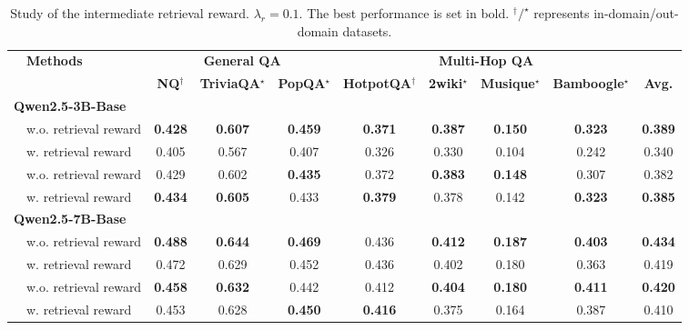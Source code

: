 \begin{table}[t]
    \centering
    \scriptsize
    \setlength{\tabcolsep}{4pt}
    
    \caption{Study of the intermediate retrieval reward. $\lambda_r=0.1$. The best performance is set in bold. $^\dagger/^\star$ represents in-domain/out-domain datasets.}\label{tab:ret-reward}
    \begin{tabular}{llcccccccc}
        \toprule
        & \textbf{Methods} & \multicolumn{3}{c}{\textbf{General QA}} & \multicolumn{4}{c}{\textbf{Multi-Hop QA}} \\
        
        \cmidrule(lr){3-5} \cmidrule(lr){6-9}
         & & \textbf{NQ$^\dagger$} & \textbf{TriviaQA$^\star$} & \textbf{PopQA$^\star$} & \textbf{HotpotQA$^\dagger$} & \textbf{2wiki$^\star$} & \textbf{Musique$^\star$} & \textbf{Bamboogle$^\star$} & \textbf{Avg.} \\
        \midrule
        \multicolumn{9}{l}{\textbf{Qwen2.5-3B-Base}} \\
        \hdashline
        \multirow{2}{*}{PPO} 
        & w.o. retrieval reward & \textbf{0.428} & \textbf{0.607} & \textbf{0.459} & \textbf{0.371} & \textbf{0.387} & \textbf{0.150} & \textbf{0.323} & \textbf{0.389}  \\
        & w. retrieval reward & 0.405 & 0.567 & 0.407 & 0.326 & 0.330 & 0.104 & 0.242 & 0.340 \\
        \hdashline
        \multirow{2}{*}{GRPO} 
        & w.o. retrieval reward & 0.429 & 0.602 & \textbf{0.435} & 0.372 & \textbf{0.383} & \textbf{0.148} & 0.307 & 0.382  \\
        & w. retrieval reward & \textbf{0.434} & \textbf{0.605} & 0.433 & \textbf{0.379} & 0.378 & 0.142 & \textbf{0.323} & \textbf{0.385} \\
        \midrule
        \multicolumn{9}{l}{\textbf{Qwen2.5-7B-Base}} \\
        \hdashline
        \multirow{2}{*}{PPO} 
        & w.o. retrieval reward & \textbf{0.488} & \textbf{0.644} & \textbf{0.469} & 0.436 & \textbf{0.412} & \textbf{0.187} & \textbf{0.403} & \textbf{0.434} \\
        & w. retrieval reward & 0.472 & 0.629 & 0.452 & 0.436 & 0.402 & 0.180 & 0.363 & 0.419 \\
        \hdashline
        \multirow{2}{*}{GRPO} 
        & w.o. retrieval reward &  \textbf{0.458} & \textbf{0.632} & 0.442 & 	0.412 & \textbf{0.404} & \textbf{0.180} & \textbf{0.411} & \textbf{0.420}  \\
        & w. retrieval reward & 0.453 & 0.628 & \textbf{0.450} & \textbf{0.416} & 0.375 & 0.164 & 0.387 & 0.410 \\
        \bottomrule
    \end{tabular}
\end{table}

